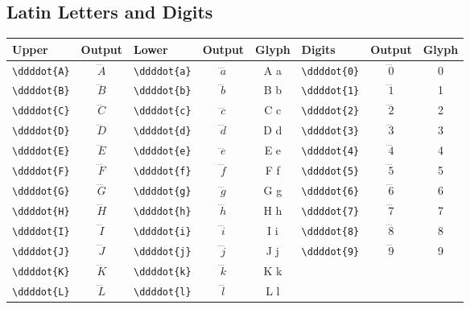 \documentclass[12pt,a4paper]{article}
\begin{document}
\subsection*{Latin Letters and Digits}
\begin{longtable}{|l|c|l|c|c|l|c|c|}
\hline
\textbf{Upper}    & \textbf{Output} & \textbf{Lower}    & \textbf{Output} & \textbf{Glyph} & \textbf{Digits}   & \textbf{Output} & \textbf{Glyph} \\
\hline
\verb|\ddddot{A}| & $\ddddot{A}$    & \verb|\ddddot{a}| & $\ddddot{a}$    & A⃜ a⃜            & \verb|\ddddot{0}| & $\ddddot{0}$    & 0⃜ \\
\verb|\ddddot{B}| & $\ddddot{B}$    & \verb|\ddddot{b}| & $\ddddot{b}$    & B⃜ b⃜            & \verb|\ddddot{1}| & $\ddddot{1}$    & 1⃜ \\
\verb|\ddddot{C}| & $\ddddot{C}$    & \verb|\ddddot{c}| & $\ddddot{c}$    & C⃜ c⃜            & \verb|\ddddot{2}| & $\ddddot{2}$    & 2⃜ \\
\verb|\ddddot{D}| & $\ddddot{D}$    & \verb|\ddddot{d}| & $\ddddot{d}$    & D⃜ d⃜            & \verb|\ddddot{3}| & $\ddddot{3}$    & 3⃜ \\
\verb|\ddddot{E}| & $\ddddot{E}$    & \verb|\ddddot{e}| & $\ddddot{e}$    & E⃜ e⃜            & \verb|\ddddot{4}| & $\ddddot{4}$    & 4⃜ \\
\verb|\ddddot{F}| & $\ddddot{F}$    & \verb|\ddddot{f}| & $\ddddot{f}$    & F⃜ f⃜            & \verb|\ddddot{5}| & $\ddddot{5}$    & 5⃜ \\
\verb|\ddddot{G}| & $\ddddot{G}$    & \verb|\ddddot{g}| & $\ddddot{g}$    & G⃜ g⃜            & \verb|\ddddot{6}| & $\ddddot{6}$    & 6⃜ \\
\verb|\ddddot{H}| & $\ddddot{H}$    & \verb|\ddddot{h}| & $\ddddot{h}$    & H⃜ h⃜            & \verb|\ddddot{7}| & $\ddddot{7}$    & 7⃜ \\
\verb|\ddddot{I}| & $\ddddot{I}$    & \verb|\ddddot{i}| & $\ddddot{i}$    & I⃜ i⃜            & \verb|\ddddot{8}| & $\ddddot{8}$    & 8⃜ \\
\verb|\ddddot{J}| & $\ddddot{J}$    & \verb|\ddddot{j}| & $\ddddot{j}$    & J⃜ j⃜            & \verb|\ddddot{9}| & $\ddddot{9}$    & 9⃜ \\
\verb|\ddddot{K}| & $\ddddot{K}$    & \verb|\ddddot{k}| & $\ddddot{k}$    & K⃜ k⃜            &                   &                 & \\
\verb|\ddddot{L}| & $\ddddot{L}$    & \verb|\ddddot{l}| & $\ddddot{l}$    & L⃜ l⃜            &                   &                 & \\

\end{longtable}
\end{document}
